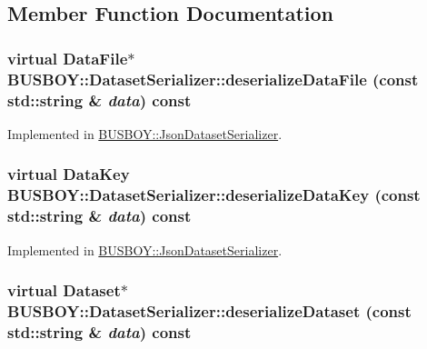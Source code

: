 \subsection{Member Function Documentation}
\hypertarget{classBUSBOY_1_1DatasetSerializer_a3937ed2b549641822c5b967f897525f0}{
\subsubsection[{deserializeDataFile}]{\setlength{\rightskip}{0pt plus 5cm}virtual {\bf DataFile}$\ast$ BUSBOY::DatasetSerializer::deserializeDataFile (const std::string \& {\em data}) const}}
\label{classBUSBOY_1_1DatasetSerializer_a3937ed2b549641822c5b967f897525f0}


Implemented in \hyperlink{classBUSBOY_1_1JsonDatasetSerializer_af9ef2ac427bb99fd0f1d0f99774f3765}{BUSBOY::JsonDatasetSerializer}.\hypertarget{classBUSBOY_1_1DatasetSerializer_a2bae57eabc95977f4c9679bb88289fa8}{
\subsubsection[{deserializeDataKey}]{\setlength{\rightskip}{0pt plus 5cm}virtual {\bf DataKey} BUSBOY::DatasetSerializer::deserializeDataKey (const std::string \& {\em data}) const}}
\label{classBUSBOY_1_1DatasetSerializer_a2bae57eabc95977f4c9679bb88289fa8}


Implemented in \hyperlink{classBUSBOY_1_1JsonDatasetSerializer_ac4cadb7d348a3fe201a360de2100b02f}{BUSBOY::JsonDatasetSerializer}.\hypertarget{classBUSBOY_1_1DatasetSerializer_a1afb118e410e71ebd7416aefd2aa7121}{
\subsubsection[{deserializeDataset}]{\setlength{\rightskip}{0pt plus 5cm}virtual {\bf Dataset}$\ast$ BUSBOY::DatasetSerializer::deserializeDataset (const std::string \& {\em data}) const}}
\label{classBUSBOY_1_1DatasetSerializer_a1afb118e410e71ebd7416aefd2aa7121}



